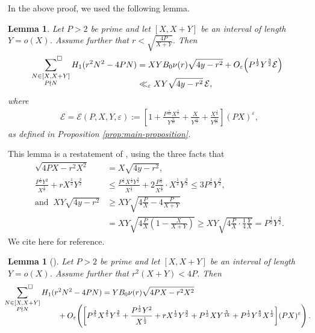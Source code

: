 \documentclass[12pt,letterpaper,reqno]{amsart}
\theoremstyle{plain}
\newtheorem*{unnumberedlemma}{Lemma}
\newtheorem{lemma}[theorem]{Lemma}
\theoremstyle{definition}
\numberwithin{equation}{section}
\numberwithin{figure}{section}
\numberwithin{table}{section}
\newcommand{\lrp}[1]{\!\left(#1\right)}
\newcommand{\lrb}[1]{\!\left[#1\right]}
\newcommand{\EE}{\mathcal{E}}
\begin{document}
In the above proof, we used the following lemma.
\begin{lemma} \label{lem:bound-sum-class-num}
    Let $P > 2$ be prime and let $[X, X+Y]$ be an interval of length $Y = o(X)$. Assume further that $r < \sqrt{\frac{4P}{X+Y}}$. Then
    \begin{align}
        \sideset{}{^\square} \sum_{\substack{N \in [X, X+Y] \\ P \nmid N}} H_1(r^2N^2-4PN) &= XYB_0\nu(r) \sqrt{4y-r^2}  + O_\varepsilon \lrp{P^\frac{1}{2} Y^\frac{3}{2} \EE} \\[-15pt]
        &\ll_\varepsilon  
        XY \sqrt{4y-r^2} \,\EE,
    \end{align}
    where
    \begin{align}  
        \EE = \EE(P,X,Y,\varepsilon) :=
        \lrb{
            1 
            + 
            \frac{
                P^\frac{1}{10} X^\frac{3}{5} 
            }{
                Y^\frac{9}{10}
            }
            +
            \frac{X}{Y^\frac{11}{9}}
            +
            \frac{X^\frac{1}{2}}{Y^\frac{11}{18}}
        }
        (PX)^\varepsilon,
    \end{align}
    as defined in Proposition \ref{prop:main-proposition}.
\end{lemma}
This lemma is a restatement of \cite[Proposition 3.6]{Zubrilina}, using the three facts that
    \begin{align}
        \sqrt{4PX-r^2X^2}&=X\sqrt{4y-r^2}, \\
        \frac{P^\frac{1}{2} Y^2}{X^\frac{1}{2}}+rX^\frac{1}{2}Y^\frac{3}{2} 
        &\le 
        \frac{P^\frac{1}{2}X^\frac{1}{2}Y^\frac{3}{2}}{X^\frac{1}{2}} + 
        2\frac{P^\frac{1}{2}}{X^\frac{1}{2}} 
        \cdot
        X^\frac{1}{2}Y^\frac{3}{2}
        \le 3 P^\frac{1}{2}Y^\frac{3}{2}, \\
        \text{and } \ 
        XY\sqrt{4y-r^2} &\ge XY\sqrt{4 \frac PX - 4 \frac{P}{X+Y}} \\
        &= XY\sqrt{4 \frac{P}{X}\lrp{1- \frac{X}{X+Y}} } \ge XY\sqrt{4 \frac{P}{X} \cdot \frac14 \frac{Y}{X} } = P^\frac{1}{2} Y^\frac{3}{2}.
    \end{align}
We cite \cite[Proposition 3.6]{Zubrilina} here for reference.

\begin{unnumberedlemma}[{\cite[Proposition 3.6]{Zubrilina}}]
    \label{lem:bound-avg-class-number}
    Let $P > 2$ be prime and let $[X, X+Y]$ be an interval of length $Y = o(X)$. Assume further that $r^2(X+Y)<4P$. Then
    \begin{align}
        \sideset{}{^\square} \sum_{\substack{N \in [X, X+Y] \\ P \nmid N}} H_1(r^2N^2-4PN) 
        &= YB_0\nu(r) \sqrt{4PX-r^2X^2} \\[-15pt]
        &\hspace{-20mm} + O_\varepsilon \lrp{\bigg[ P^\frac{3}{5}X^\frac{3}{5}Y^\frac{3}{5} + \frac{P^\frac{1}{2}Y^2}{X^\frac{1}{2}} + rX^\frac{1}{2}Y^\frac{3}{2} + P^\frac{1}{2}XY^\frac{5}{18} + P^\frac{1}{2}Y^\frac{8}{9}X^\frac{1}{2} \bigg] (PX)^\varepsilon}.
    \end{align}
\end{unnumberedlemma}
\end{document}
